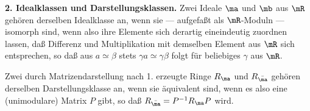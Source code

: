 \textbf{2. Idealklassen und Darstellungsklassen.} Zwei Ideale $\ma$ und $\mb$ aus $\mR$ gehören derselben Idealklasse an, wenn sie --- aufgefaßt als $\mR$-Moduln --- isomorph sind, wenn also ihre Elemente sich derartig eineindeutig zuordnen lassen, daß Differenz und Multiplikation mit demselben Element aus $\mR$ sich entsprechen, so daß aus $a\simeq\beta$ stets $\gamma a\simeq\gamma\beta$ folgt für beliebiges $\gamma$ aus $\mR$.

Zwei durch Matrizendarstellung nach 1. erzeugte Ringe $R_\ma$ und $R_{\bar\ma}$ gehören derselben Darstellungsklasse an, wenn sie äquivalent sind, wenn es also eine (unimodulare) Matrix $P$ gibt, so daß $R_{\bar\ma}=P^{-1}R_\ma P$ wird.